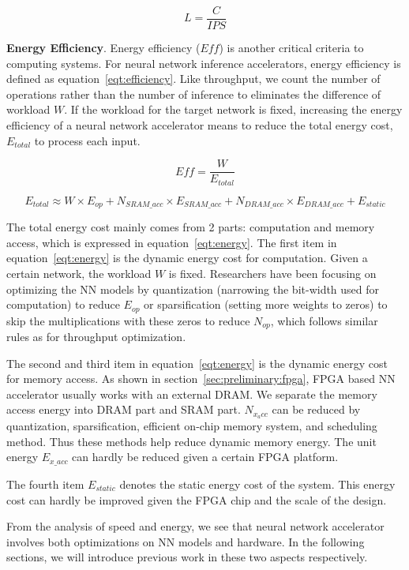 \begin{equation}\label{eqt:latency}
    L = \frac{C}{IPS}
\end{equation}

\textbf{Energy Efficiency}. Energy efficiency ($Eff$) is another critical criteria to computing systems. For neural network inference accelerators, energy efficiency is defined as equation~\ref{eqt:efficiency}. Like throughput, we count the number of operations rather than the number of inference to eliminates the difference of workload $W$. If the workload for the target network is fixed, increasing the energy efficiency of a neural network accelerator means to reduce the total energy cost, $E_{total}$ to process each input. 

\begin{equation}\label{eqt:efficiency}
    Eff = \frac{W}{E_{total}}
\end{equation}
    
\begin{equation}\label{eqt:energy}
    E_{total} \approx W\times E_{op} + N_{SRAM\_acc}\times E_{SRAM\_acc} + N_{DRAM\_acc}\times E_{DRAM\_acc} + E_{static}
\end{equation}

The total energy cost mainly comes from 2 parts: computation and memory access, which is expressed in equation~\ref{eqt:energy}. The first item in equation~\ref{eqt:energy} is the dynamic energy cost for computation. Given a certain network, the workload $W$ is fixed. Researchers have been focusing on optimizing the NN models by quantization (narrowing the bit-width used for computation) to reduce $E_{op}$ or sparsification (setting more weights to zeros) to skip the multiplications with these zeros to reduce $N_{op}$, which follows similar rules as for throughput optimization. 

The second and third item in equation~\ref{eqt:energy} is the dynamic energy cost for memory access. As shown in section~\ref{sec:preliminary:fpga}, FPGA based NN accelerator usually works with an external DRAM. We separate the memory access energy into DRAM part and SRAM part. $N_{x_acc}$ can be reduced by quantization, sparsification, efficient on-chip memory system, and scheduling method. Thus these methods help reduce dynamic memory energy. The unit energy $E_{x\_acc}$ can hardly be reduced given a certain FPGA platform.

The fourth item $E_{static}$ denotes the static energy cost of the system. This energy cost can hardly be improved given the FPGA chip and the scale of the design.

From the analysis of speed and energy, we see that neural network accelerator involves both optimizations on NN models and hardware. In the following sections, we will introduce previous work in these two aspects respectively.
